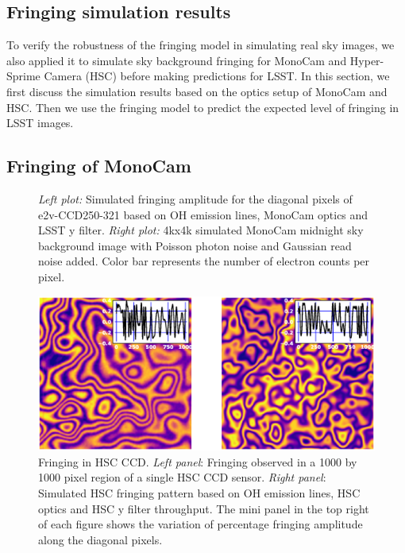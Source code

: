 \documentclass[twocolumn]{aastex63} %
\begin{document}
\begin{CJK*}{UTF8}{gbsn}



\section{Fringing simulation results} \label{sec:real_sky}
To verify the robustness of the fringing model in simulating real sky images, we also applied it to simulate sky background fringing for MonoCam \citep{Brooks17} and Hyper-Sprime Camera (HSC) \citep{Miyazaki18} before making predictions for LSST. In this section, we first discuss the simulation results based on the optics setup of MonoCam and HSC. Then we use the fringing model to predict the expected level of fringing in LSST images.

\subsection{Fringing of MonoCam} \label{sec: MonoCam sim}
\begin{figure}[thb] 

\centering
{}
\caption{{\it Left plot:} Simulated fringing amplitude for the diagonal pixels of e2v-CCD250-321 based on OH emission lines, MonoCam optics and LSST y filter. {\it Right plot:} 4kx4k simulated MonoCam midnight sky background image with Poisson photon noise and Gaussian read noise added. Color bar represents the number of electron counts per pixel.}
\label{fig:MonoCam_sims}
\end{figure}

\begin{figure}[bt]
\centering
\includegraphics[scale = 0.5]{HSC-data-sim.eps}
\caption{Fringing in HSC CCD. {\it Left panel}: Fringing observed in a 1000 by 1000 pixel region of a single HSC CCD sensor. {\it Right panel}: Simulated HSC fringing pattern based on OH emission lines, HSC optics and HSC y filter throughput. The mini panel in the top right of each figure shows the variation of percentage fringing amplitude along the diagonal pixels.}
\label{fig:HSC_sims}
\end{figure}


\end{CJK*}
\end{document}
